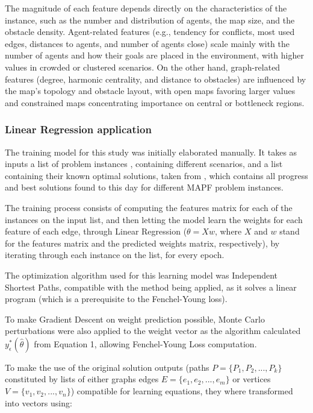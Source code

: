 The magnitude of each feature depends directly on the characteristics of the instance, such as the number and distribution of agents, the map size, and the obstacle density. Agent-related features (e.g., tendency for conflicts, most used edges, distances to agents, and number of agents close) scale mainly with the number of agents and how their goals are placed in the environment, with higher values in crowded or clustered scenarios. On the other hand, graph-related features (degree, harmonic centrality, and distance to obstacles) are influenced by the map’s topology and obstacle layout, with open maps favoring larger values and constrained maps concentrating importance on central or bottleneck regions.

\subsubsection{Linear Regression application}

The training model for this study was initially elaborated manually. It takes as inputs a list of problem instances \cite{shenTrackingProgressMultiAgent2023}, containing different scenarios, and a list containing their known optimal solutions, taken from \cite{shenTrackingProgressMultiAgent2023}, which contains all progress and best solutions found to this day for different MAPF problem instances.

The training process consists of computing the features matrix for each of the instances on the input list, and then letting the model learn the weights for each feature of each edge, through Linear Regression ($\theta = Xw$, where $X$ and $w$ stand for the features matrix and the predicted weights matrix, respectively), by iterating through each instance on the list, for every epoch.

The optimization algorithm used for this learning model was Independent Shortest Paths, compatible with the method being applied, as it solves a linear program (which is a prerequisite to the Fenchel-Young loss).

To make Gradient Descent on weight prediction possible, Monte Carlo perturbations \cite{berthetLearningDifferentiablePertubed2020} were also applied to the weight vector as the algorithm calculated $y^*_\epsilon(\hat\theta)$ from Equation 1, allowing Fenchel-Young Loss computation. 

To make the use of the original solution outputs (paths $P=\{P_1, P_2,...,P_k\}$ constituted by lists of either graphs edges $E=\{e_1,e_2, ..., e_m\}$ or vertices $V=\{v_1, v_2,...,v_n\}$) compatible for learning equations, they where transformed into vectors using:


